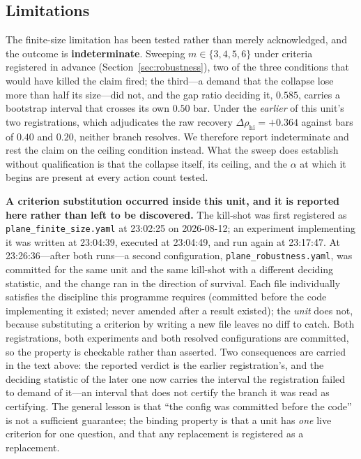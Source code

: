 \subsection{Limitations}
The finite-size limitation has been tested rather than merely acknowledged, and the outcome
is \textbf{indeterminate}. Sweeping $m\in\{3,4,5,6\}$ under criteria registered in advance
(Section~\ref{sec:robustness}), two of the three conditions that would have killed the claim
fired; the third---a demand that the collapse lose more than half its size---did not, and the
gap ratio deciding it, $0.585$, carries a bootstrap interval that crosses its own $0.50$ bar.
Under the \emph{earlier} of this unit's two registrations, which adjudicates the raw recovery
$\Delta\rho_{\mathrm{hi}}=+0.364$ against bars of $0.40$ and $0.20$, neither branch resolves.
We therefore report indeterminate and rest the claim on the ceiling condition instead. What
the sweep does establish without qualification is that the collapse itself, its ceiling, and
the $\alpha$ at which it begins are present at every action count tested.

\textbf{A criterion substitution occurred inside this unit, and it is reported here rather
than left to be discovered.} The kill-shot was first registered as
\texttt{plane\_finite\_size.yaml} at 23:02:25 on 2026-08-12; an experiment implementing it
was written at 23:04:39, executed at 23:04:49, and run again at 23:17:47. At 23:26:36---after
both runs---a second configuration, \texttt{plane\_robustness.yaml}, was committed for the
same unit and the same kill-shot with a different deciding statistic, and the change ran in
the direction of survival. Each file individually satisfies the discipline this programme
requires (committed before the code implementing it existed; never amended after a result
existed); the \emph{unit} does not, because substituting a criterion by writing a new file
leaves no diff to catch. Both registrations, both experiments and both resolved
configurations are committed, so the property is checkable rather than asserted. Two
consequences are carried in the text above: the reported verdict is the earlier
registration's, and the deciding statistic of the later one now carries the interval the
registration failed to demand of it---an interval that does not certify the branch it was
read as certifying. The general lesson is that ``the config was committed before the code''
is not a sufficient guarantee; the binding property is that a unit has \emph{one} live
criterion for one question, and that any replacement is registered as a replacement.

